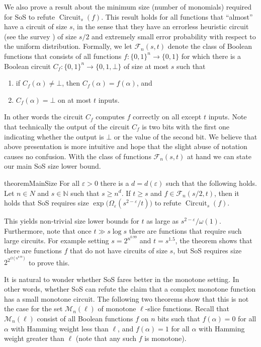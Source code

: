 \documentclass[10pt,a4paper]{article}
\theoremstyle{plain}
\theoremstyle{remark}
\theoremstyle{definition}
\newcommand{\eps}{\varepsilon}
\newcommand{\set}[1]{\{#1\}}
\newcommand{\calF}{\mathcal{F}}
\newcommand{\calM}{\mathcal{M}}
\newcommand{\N}{\mathbb{N}}
\DeclareMathOperator{\circuit}{Circuit}
\begin{document}
We also prove a result about the minimum size (number of monomials)
required for SoS to refute $\circuit_s(f)$. This result holds for all
functions that ``almost'' have a circuit of size $s$, in the sense that
they have an errorless heuristic circuit (see the survey \cite{BT06})
of size $s/2$ and extremely small error probability
with respect to the uniform distribution.
% 
Formally, we let $\calF_n(s,t)$ denote the class of Boolean functions
that consists of all functions $f: \set{0,1}^n \rightarrow \set{0,1}$
for which there is a Boolean circuit
$C_f: \set{0,1}^n \rightarrow \set{0, 1, \bot}$ of size at most $s$
such that
\begin{enumerate}
\item if $C_f(\alpha) \neq \bot$, then $C_f(\alpha) = f(\alpha)$, and
\item $C_f(\alpha) = \bot$ on at most $t$ inputs.
\end{enumerate}
In other words the circuit $C_f$ computes $f$ correctly on all except
$t$ inputs. Note that technically the output of the circuit $C_f$ is
two bits with the first one indicating whether the output is $\bot$ or
the value of the second bit.  We believe that above presentation is
more intuitive and hope that the slight abuse of notation causes no
confusion. With the class of functions $\calF_n(s,t)$ at hand we can
state our main SoS size lower bound.


\begin{restatable}{theorem}{MainSize}
  \label{thm:main-size}
  For all $\eps > 0$ there is a $d = d(\eps)$ such that the following
  holds. Let $n \in N$ and $s \in \N$ such that $s \ge n^d$. If
  $t \ge s$ and $f \in \calF_n(s/2, t)$, then it holds that SoS
  requires size $\exp\big(\Omega_\eps(s^{2-\eps}/t)\big)$ to refute
  $\circuit_s(f)$.
\end{restatable}

This yields non-trivial size lower bounds for $t$ as large as
$s^{2-\eps}/\omega(1)$.  Furthermore, note that once $t \gg s \log s$
there are functions that require such large circuits.  For example
setting $s = 2^{n^{0.99}}$ and $t = s^{1.5}$, the theorem shows that
there are functions $f$ that do not have circuits of size $s$, but SoS
requires size $2^{2^{\Omega(n^{0.99})}}$ to prove this.

It is natural to wonder whether SoS fares better in the monotone
setting. In other words, whether SoS can refute the claim that a
complex monotone function has a small monotone circuit. The following
two theorems show that this is not the case for the set
$\calM_n(\ell)$ of monotone $\ell$-slice functions.  Recall that
$\calM_n(\ell)$ consist of all Boolean functions $f$ on $n$ bits such
that $f(\alpha) = 0$ for all $\alpha$ with Hamming weight less than
$\ell$, and $f(\alpha) = 1$ for all $\alpha$ with Hamming weight
greater than $\ell$ (note that any such $f$ is monotone).
\end{document}
